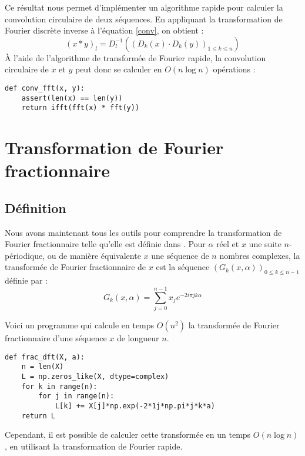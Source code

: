 \documentclass{article}
\begin{document}
Ce résultat nous permet d'implémenter un algorithme rapide pour calculer la convolution circulaire de deux séquences. En appliquant la transformation de Fourier discrète inverse à l'équation \eqref{conv}, on obtient :
$$ (x*y)_l  = D_l^{-1}((D_k(x)\cdot D_k(y))_{1\le k\le n})$$
À l'aide de l'algorithme de transformée de Fourier rapide, la convolution circulaire de $x$ et $y$ peut donc se calculer en $O(n\log n)$ opérations :
\begin{verbatim}
def conv_fft(x, y):
    assert(len(x) == len(y))
    return ifft(fft(x) * fft(y))
\end{verbatim}


\section{Transformation de Fourier fractionnaire}
\subsection{Définition}
Nous avons maintenant tous les outils pour comprendre la transformation de Fourier fractionnaire telle qu'elle est définie dans \cite{FRAC}. 
Pour $\alpha$ réel et $x$ une suite $n$-périodique, ou de manière équivalente $x$ une séquence de $n$ nombres complexes, la transformée de Fourier fractionnaire de $x$ est la séquence $(G_k(x, \alpha))_{0\le k\le n-1}$ définie par :
$$ G_k(x, \alpha)= \sum_{j=0}^{n-1}x_je^{-2i\pi jk\alpha} $$ 

Voici un programme qui calcule en temps $O(n^2)$ la transformée de Fourier fractionnaire d'une séquence $x$ de longueur $n$.
\begin{verbatim}
def frac_dft(X, a):
    n = len(X)
    L = np.zeros_like(X, dtype=complex)
    for k in range(n):
        for j in range(n):
            L[k] += X[j]*np.exp(-2*1j*np.pi*j*k*a)
    return L
\end{verbatim}

Cependant, il est possible de calculer cette transformée en un temps $O(n\log n)$, en utilisant la transformation de Fourier rapide. 
\end{document}
